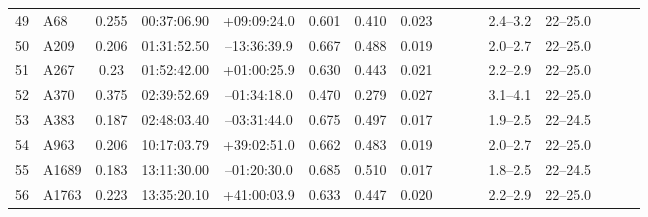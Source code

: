 \documentclass[useAMS,usenatbib]{mnras}
\begin{document}
\begin{table}
\begin{tabular*}{1.0\textwidth}{ l l c c c r c c c c c c c c l l }
49 & A68 & 0.255 & 00:37:06.90 & +09:09:24.0 & 0.601 & 0.410 & 0.023 \hspace{8pt}& & & \hspace{8pt}& 2.4--3.2 \hspace{8pt}& 22--25.0 \\
50 & A209 & 0.206 & 01:31:52.50 & \hspace{1.5pt}--\hspace{0.5pt}13:36:39.9 & 0.667 & 0.488 & 0.019 \hspace{8pt}& & & \hspace{8pt}& 2.0--2.7 \hspace{8pt}& 22--25.0 \\
51 & A267 & 0.23 & 01:52:42.00 & +01:00:25.9 & 0.630 & 0.443 & 0.021 \hspace{8pt}& & & \hspace{8pt}& 2.2--2.9 \hspace{8pt}& 22--25.0 \\
52 & A370 & 0.375 & 02:39:52.69 & \hspace{1.5pt}--\hspace{0.5pt}01:34:18.0 & 0.470 & 0.279 & 0.027 \hspace{8pt}& & & \hspace{8pt}& 3.1--4.1 \hspace{8pt}& 22--25.0 \\
53 & A383 & 0.187 & 02:48:03.40 & \hspace{1.5pt}--\hspace{0.5pt}03:31:44.0 & 0.675 & 0.497 & 0.017 \hspace{8pt}& & & \hspace{8pt}& 1.9--2.5 \hspace{8pt}& 22--24.5 \\
54 & A963 & 0.206 & 10:17:03.79 & +39:02:51.0 & 0.662 & 0.483 & 0.019 \hspace{8pt}& & & \hspace{8pt}& 2.0--2.7 \hspace{8pt}& 22--25.0 \\
55 & A1689 & 0.183 & 13:11:30.00 & \hspace{1.5pt}--\hspace{0.5pt}01:20:30.0 & 0.685 & 0.510 & 0.017 \hspace{8pt}& & & \hspace{8pt}& 1.8--2.5 \hspace{8pt}& 22--24.5 \\
56 & A1763 & 0.223 & 13:35:20.10 & +41:00:03.9 & 0.633 & 0.447 & 0.020 \hspace{8pt}& & & \hspace{8pt}& 2.2--2.9 \hspace{8pt}& 22--25.0 \\

\end{tabular*}
\end{table}
\end{document}

